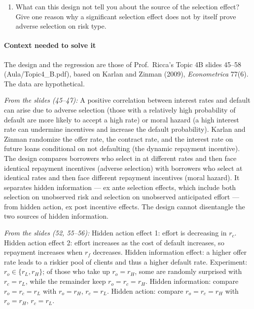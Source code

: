 \documentclass[11pt,a4paper]{article}
\begin{document}
\begin{enumerate}
  \(R_b\) on success and \(0\) on failure; in addition, a dynamic incentive makes her lose
  \(C_b \ge 0\) (the value of cheaper future loans) if the project fails. (i) Write the incentive
  constraint and show that it becomes \((\Delta p)(R_b + C_b) \ge B\). (ii) Compute the pledgeable
  income and the minimum assets \(\bar A\) needed for financing for \(C_b = 0\) and \(C_b = 0.2\).
  (iii) Compute the borrower's net utility when financed with \(C_b = 0.2\), counting the loss
  \(C_b\) as a deadweight cost. (iv) Use (i)--(iii) to interpret the repayment-burden and
  dynamic-incentive effects of part (a).
\item
  What can this design not tell you about the source of the selection effect? Give one reason why a
  significant selection effect does not by itself prove adverse selection on risk type.
\end{enumerate}

\paragraph{Context needed to solve it}

The design and the regression are those of Prof.~Ricca's Topic 4B slides 45--58
(Aula/Topic4\_B.pdf), based on Karlan and Zinman (2009), \emph{Econometrica} 77(6). The data are
hypothetical.

\emph{From the slides (45--47):} A positive correlation between interest rates and default can arise
due to adverse selection (those with a relatively high probability of default are more likely to
accept a high rate) or moral hazard (a high interest rate can undermine incentives and increase the
default probability). Karlan and Zinman randomize the offer rate, the contract rate, and the
interest rate on future loans conditional on not defaulting (the dynamic repayment incentive). The
design compares borrowers who select in at different rates and then face identical repayment
incentives (adverse selection) with borrowers who select at identical rates and then face different
repayment incentives (moral hazard). It separates hidden information --- ex ante selection effects,
which include both selection on unobserved risk and selection on unobserved anticipated effort ---
from hidden action, ex post incentive effects. The design cannot disentangle the two sources of
hidden information.

\emph{From the slides (52, 55--56):} Hidden action effect 1: effort is decreasing in \(r_c\). Hidden
action effect 2: effort increases as the cost of default increases, so repayment increases when
\(r_f\) decreases. Hidden information effect: a higher offer rate leads to a riskier pool of clients
and thus a higher default rate. Experiment: \(r_o \in \{r_L, r_H\}\); of those who take up
\(r_o = r_H\), some are randomly surprised with \(r_c = r_L\), while the remainder keep
\(r_o = r_c = r_H\). Hidden information: compare \(r_o = r_c = r_L\) with \(r_o = r_H\),
\(r_c = r_L\). Hidden action: compare \(r_o = r_c = r_H\) with \(r_o = r_H\), \(r_c = r_L\).
\end{document}
